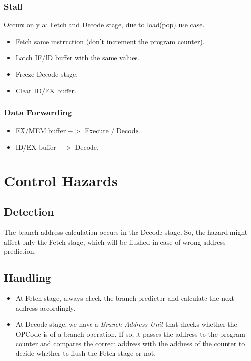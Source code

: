 \documentclass[12pt]{report}
\begin{document}
\subsubsection{Stall}
Occurs only at Fetch and Decode stage, due to load(pop) use case.
\begin{itemize}
    \item Fetch same instruction (don't increment the program counter).
    \item Latch IF/ID buffer with the same values.
    \item Freeze Decode stage.
    \item Clear ID/EX buffer.
\end{itemize}

\subsubsection{Data Forwarding}
\begin{itemize}
    \item EX/MEM buffer $->$ Execute / Decode.
    \item ID/EX buffer $->$ Decode.
\end{itemize}

\section{Control Hazards}

\subsection{Detection}
The branch address calculation occurs in the Decode stage. So, the hazard might affect only the Fetch stage, which will be flushed in case of wrong address prediction.

\subsection{Handling}
\begin{itemize}
    \item At Fetch stage, always check the branch predictor and calculate the next address accordingly.
    \item At Decode stage, we have a \emph{Branch Address Unit} that checks whether the OPCode is of a branch operation. If so, it passes the address to the program counter and compares the correct address with the address of the counter to decide whether to flush the Fetch stage or not. 
\end{itemize}
\end{document}
